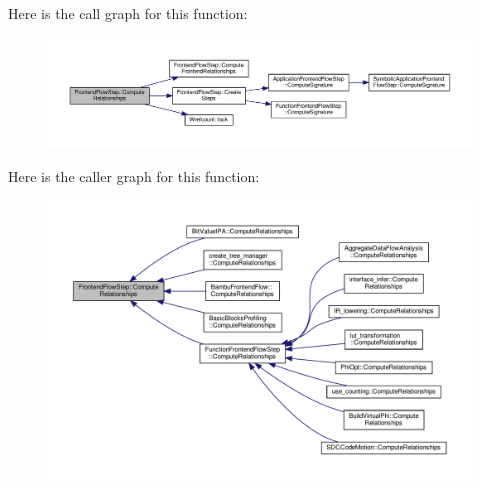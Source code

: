Here is the call graph for this function\+:
\nopagebreak
\begin{figure}[H]
\begin{center}
\leavevmode
\includegraphics[width=350pt]{d9/d37/classFrontendFlowStep_a532ee0d76d7a10c373b4a7478a7eee18_cgraph}
\end{center}
\end{figure}
Here is the caller graph for this function\+:
\nopagebreak
\begin{figure}[H]
\begin{center}
\leavevmode
\includegraphics[width=350pt]{d9/d37/classFrontendFlowStep_a532ee0d76d7a10c373b4a7478a7eee18_icgraph}
\end{center}
\end{figure}
\mbox{\label{classFrontendFlowStep_ad3ca11749bede7a0f026d2cb6c9f6cba}} 
